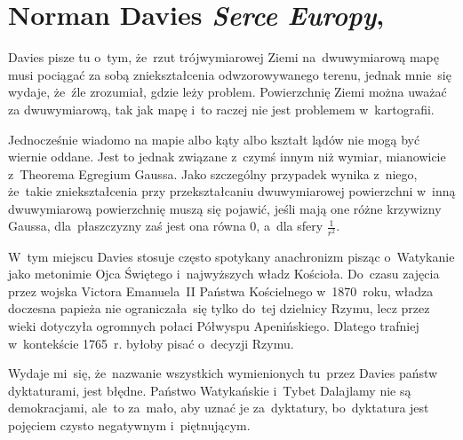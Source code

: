 \documentclass[a4paper,11pt]{article}
\numberwithin{equation}{section}
\begin{document}
\VerSpaceTwo












\section{Norman Davies \textit{Serce Europy}, \cite{DaviesSerceEuropy2014} }




 Davies pisze tu o~tym, że~rzut trójwymiarowej Ziemi
na~dwuwymiarową mapę musi pociągać za sobą zniekształcenia
odwzorowywanego terenu, jednak mnie~się wydaje, że~źle zrozumiał,
gdzie leży problem. Powierzchnię Ziemi można uważać za dwuwymiarową,
tak jak mapę i~to raczej nie jest problemem w~kartografii.

Jednocześnie wiadomo na mapie albo kąty albo kształt lądów nie mogą
być wiernie oddane. Jest to jednak związane z~czymś innym niż wymiar,
mianowicie z~Theorema Egregium Gaussa. Jako szczególny przypadek
wynika z~niego, że~takie zniekształcenia przy przekształcaniu
dwuwymiarowej powierzchni w~inną dwuwymiarową powierzchnię muszą się
pojawić, jeśli mają one różne krzywizny Gaussa, dla~płaszczyzny zaś
jest ona równa 0, a~dla sfery $\frac{ 1 }{ r^{ 2 } }$.

\VerSpaceFour





 W~tym miejscu Davies stosuje często spotykany
anachronizm pisząc o~Watykanie jako metonimie Ojca Świętego
i~najwyższych władz Kościoła. Do~czasu zajęcia przez wojska Victora
Emanuela~II Państwa Kościelnego w~1870~roku, władza doczesna papieża
nie ograniczała~się tylko do~tej dzielnicy Rzymu, lecz przez wieki
dotyczyła ogromnych połaci Półwyspu Apenińskiego. Dlatego trafniej
w~kontekście 1765~r. byłoby pisać o~decyzji Rzymu.

\VerSpaceFour





 Wydaje mi~się, że~nazwanie wszystkich wymienionych
tu~przez Davies państw dyktaturami, jest błędne. Państwo Watykańskie
i~Tybet Dalajlamy nie są demokracjami, ale~to za~mało, aby uznać je
za~dyktatury, bo~dyktatura jest pojęciem czysto negatywnym
i~piętnującym.
\end{document}
